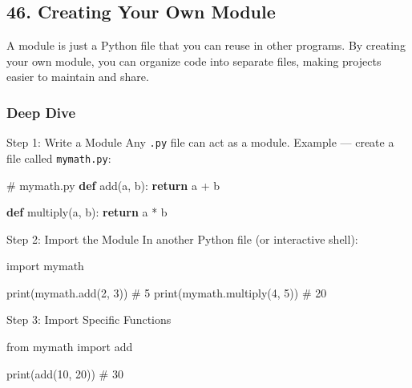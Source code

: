 \documentclass[
  letterpaper,
  DIV=11,
  numbers=noendperiod]{scrreprt}
\newenvironment{Shaded}{\begin{snugshade}}{\end{snugshade}}
\newcommand{\BuiltInTok}[1]{\textcolor[rgb]{0.00,0.23,0.31}{#1}}
\newcommand{\CommentTok}[1]{\textcolor[rgb]{0.37,0.37,0.37}{#1}}
\newcommand{\ControlFlowTok}[1]{\textcolor[rgb]{0.00,0.23,0.31}{\textbf{#1}}}
\newcommand{\DecValTok}[1]{\textcolor[rgb]{0.68,0.00,0.00}{#1}}
\newcommand{\ImportTok}[1]{\textcolor[rgb]{0.00,0.46,0.62}{#1}}
\newcommand{\KeywordTok}[1]{\textcolor[rgb]{0.00,0.23,0.31}{\textbf{#1}}}
\newcommand{\NormalTok}[1]{\textcolor[rgb]{0.00,0.23,0.31}{#1}}
\newcommand{\OperatorTok}[1]{\textcolor[rgb]{0.37,0.37,0.37}{#1}}
\begin{document}
\subsection{46. Creating Your Own
Module}\label{creating-your-own-module}

A module is just a Python file that you can reuse in other programs. By
creating your own module, you can organize code into separate files,
making projects easier to maintain and share.

\subsubsection{Deep Dive}\label{deep-dive-45}

Step 1: Write a Module Any \texttt{.py} file can act as a module.
Example --- create a file called \texttt{mymath.py}:

\begin{Shaded}
\begin{Highlighting}[]
\CommentTok{\# mymath.py}
\KeywordTok{def}\NormalTok{ add(a, b):}
    \ControlFlowTok{return}\NormalTok{ a }\OperatorTok{+}\NormalTok{ b}

\KeywordTok{def}\NormalTok{ multiply(a, b):}
    \ControlFlowTok{return}\NormalTok{ a }\OperatorTok{*}\NormalTok{ b}
\end{Highlighting}
\end{Shaded}

Step 2: Import the Module In another Python file (or interactive shell):

\begin{Shaded}
\begin{Highlighting}[]
\ImportTok{import}\NormalTok{ mymath}

\BuiltInTok{print}\NormalTok{(mymath.add(}\DecValTok{2}\NormalTok{, }\DecValTok{3}\NormalTok{))       }\CommentTok{\# 5}
\BuiltInTok{print}\NormalTok{(mymath.multiply(}\DecValTok{4}\NormalTok{, }\DecValTok{5}\NormalTok{))  }\CommentTok{\# 20}
\end{Highlighting}
\end{Shaded}

Step 3: Import Specific Functions

\begin{Shaded}
\begin{Highlighting}[]
\ImportTok{from}\NormalTok{ mymath }\ImportTok{import}\NormalTok{ add}

\BuiltInTok{print}\NormalTok{(add(}\DecValTok{10}\NormalTok{, }\DecValTok{20}\NormalTok{))   }\CommentTok{\# 30}
\end{Highlighting}
\end{Shaded}
\end{document}

